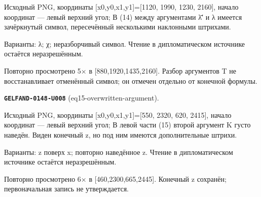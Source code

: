 \documentclass[11pt]{article}
\theoremstyle{definition}
\theoremstyle{remark}
\begin{document}
Исходный PNG, координаты [x0,y0,x1,y1]=[1120, 1990, 1230, 2160], начало координат — левый верхний угол; В (14) между аргументами λ̄′ и λ имеется зачёркнутый символ, пересечённый несколькими наклонными штрихами.\par
Варианты: λ; χ; неразборчивый символ. Чтение в дипломатическом источнике остаётся неразрешённым.\par
Повторно просмотрено 5× в [880,1920,1435,2160]. Разбор аргументов T не восстанавливает отменённый символ; он отмечен отдельно от конечной формулы.\par\medskip
\noindent\leavevmode{}\label{GELFAND-P001360:eq15-overwritten-argument:note}\textbf{\texttt{GELFAND-0148-U008}} (eq15-overwritten-argument).\par\nopagebreak[4]
Исходный PNG, координаты [x0,y0,x1,y1]=[550, 2320, 620, 2415], начало координат — левый верхний угол; В левой части (15) второй аргумент K густо наведён. Виден конечный z, но под ним имеются дополнительные штрихи.\par
Варианты: z поверх x; повторно наведённое z. Чтение в дипломатическом источнике остаётся неразрешённым.\par
Повторно просмотрено 6× в [460,2300,665,2445]. Конечный z сохранён; первоначальная запись не утверждается.\par\medskip
\end{document}

